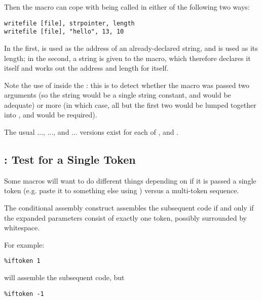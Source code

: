 Then the  macro can cope with being called in either of
the following two ways:

\begin{lstlisting}
writefile [file], strpointer, length
writefile [file], "hello", 13, 10
\end{lstlisting}

In the first,  is used as the address of an
already-declared string, and  is used as its length; in
the second, a string is given to the macro, which therefore declares
it itself and works out the address and length for itself.

Note the use of  inside the : this is to detect
whether the macro was passed two arguments (so the string would be a
single string constant, and  would be adequate) or more (in
which case, all but the first two would be lumped together into
, and  would be required).

The usual ...,
..., and
...
versions exist for each of ,  and .

\subsection{: Test for a Single Token}
\label{subsec:iftoken}

Some macros will want to do different things depending on if it is
passed a single token (e.g. paste it to something else using \code{\%+})
versus a multi-token sequence.

The conditional assembly construct  assembles the
subsequent code if and only if the expanded parameters consist of
exactly one token, possibly surrounded by whitespace.

For example:

\begin{lstlisting}
%iftoken 1
\end{lstlisting}

will assemble the subsequent code, but

\begin{lstlisting}
%iftoken -1
\end{lstlisting}

